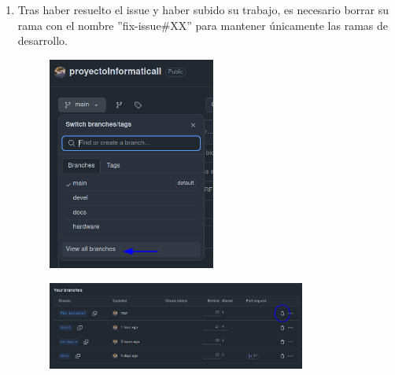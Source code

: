 \documentclass[a4paper]{article}
\begin{document}
\begin{enumerate}
\item Tras haber resuelto el issue y haber subido su trabajo, es necesario borrar su rama con el nombre ''fix-issue\#XX'' para mantener únicamente las ramas de desarrollo. \\

    \begin{figure}[h!]
        \centering
        \includegraphics[width=5.5cm]{../imagenesParaInformes/ramasDelProyecto.png}
    \end{figure}

    \begin{figure}[h!]
        \centering
        \includegraphics[width=8.5cm]{../imagenesParaInformes/yourBranches.png}
    \end{figure}

\end{enumerate}
\end{document}
